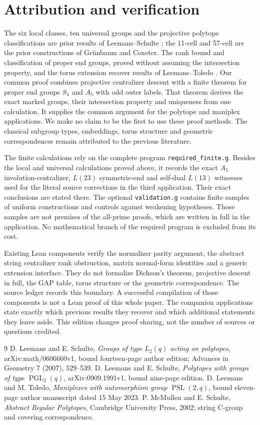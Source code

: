 \documentclass[11pt,a4paper]{article}
\newcommand{\PSL}{\operatorname{PSL}}
\newcommand{\PGL}{\operatorname{PGL}}
\begin{document}
\section{Attribution and verification}
The six local classes, ten universal groups and the projective polytope
classifications are prior results of Leemans--Schulte \cite{LS1,LS2}; the
11-cell and 57-cell are the prior constructions of Gr\"unbaum and Coxeter.
The rank bound and classification of proper end groups, proved without
assuming the intersection property, and the torus extension recover
results of Leemans--Toledo \cite{LT}.
Our common proof combines projective centralizer descent with a finite
theorem for proper end groups $S_4$ and $A_5$ with odd outer labels.
That theorem derives the exact marked groups, their intersection property
and uniqueness from one calculation. It supplies the common argument for
the polytope and maniplex applications. We make no claim to be the first
to use these proof methods. The classical subgroup types, embeddings,
torus structure and geometric correspondences remain attributed to the
previous literature.

The finite calculations rely on the complete program
\texttt{required\_finite.g}. Besides the local and universal calculations
proved above, it records the exact $A_5$ involution-centralizer, $L(23)$
symmetric-end and self-dual $L(13)$ witnesses used for the literal source
corrections in the third application. Their exact conclusions are stated
there. The optional \texttt{validation.g} contains finite samples of
uniform constructions and controls against weakening hypotheses. Those
samples are not premises of the all-prime proofs, which are written in
full in the application. No mathematical branch of the required program
is excluded from its cost.

Existing Lean components verify the normalizer parity argument, the
abstract string centralizer rank obstruction, matrix normal-form identities
and a generic extension interface. They do not formalize Dickson's theorem,
projective descent in full, the GAP table, torus structure or the geometric
correspondence. The source ledger records this boundary. A successful
compilation of those components is not a Lean proof of this whole paper.
The companion applications state exactly which previous results they
recover and which additional statements they leave aside. This edition changes proof sharing, not the
number of sources or questions credited.

\begin{thebibliography}{9}
 D. Leemans and E. Schulte, \emph{Groups of type $L_2(q)$ acting
on polytopes}, arXiv:math/0606660v1, bound fourteen-page author edition;
Advances in Geometry 7 (2007), 529--539.
 D. Leemans and E. Schulte, \emph{Polytopes with groups of type
$\PGL_2(q)$}, arXiv:0909.1991v1, bound nine-page edition.
 D. Leemans and M. Toledo, \emph{Maniplexes with automorphism
group $\PSL(2,q)$}, bound eleven-page author manuscript dated 15 May 2023.
 P. McMullen and E. Schulte, \emph{Abstract Regular Polytopes},
Cambridge University Press, 2002; string C-group and covering correspondence.
\end{thebibliography}
\end{document}
